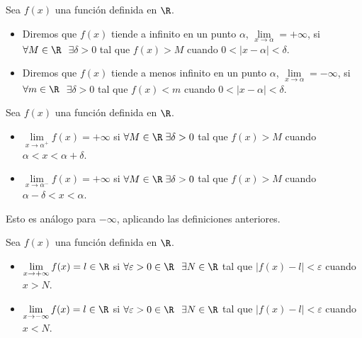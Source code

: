 \begin{definition}
	Sea \(f(x )\) una función definida en \(\R \).

	\begin{itemize}
		\item Diremos que \(f(x )\) tiende a infinito en un punto \(\alpha\), \(\lim\limits_{x  \to \alpha} = + \infty \), si \(\forall M \in \R \) \(\; \exists \delta > 0 \) tal que \(f(x) > M \) cuando \(0 < \left\vert x - \alpha \right\vert < \delta\).

		\item Diremos que \(f(x )\) tiende a menos infinito en un punto \(\alpha\), \(\lim\limits_{x  \to \alpha} = - \infty \), si \(\forall m \in \R \) \(\; \exists \delta > 0 \) tal que \(f(x) < m \) cuando \(0 < \left\vert x - \alpha \right\vert < \delta\).
	\end{itemize}
\end{definition}
\begin{definition}
	Sea \(f(x )\) una función definida en \(\R \).

	\begin{itemize}
		\item \(\lim\limits_{x  \to \alpha^{+}} f(x) = +\infty\) si \(\forall M \in \R \; \exists \delta > 0 \) tal que \(f(x) > M \) cuando \(\alpha < x < \alpha + \delta\).

		\item \(\lim\limits_{x  \to \alpha^{-}} f(x) = +\infty\) si \(\forall M \in \R \; \exists \delta > 0 \) tal que \(f(x) > M \) cuando \(\alpha - \delta < x < \alpha\).
	\end{itemize}

	Esto es análogo para \(-\infty\), aplicando las definiciones anteriores.
\end{definition}
\begin{definition}
	Sea \(f(x )\) una función definida en \(\R \).

	\begin{itemize}
		\item \(\lim\limits_{x  \to +\infty} f(x) = l \in \R \) si \(\forall \varepsilon > 0 \in \R \) \(\; \exists N \in \R \) tal que \(\left\vert f(x) - l  \right\vert < \varepsilon\) cuando \(x > N \).
		\item \(\lim\limits_{x  \to - \infty} f(x) = l \in \R \) si \(\forall \varepsilon > 0 \in \R \) \(\; \exists N \in \R \) tal que \(\left\vert f(x) - l  \right\vert < \varepsilon\) cuando \(x < N \).
	\end{itemize}
\end{definition}


